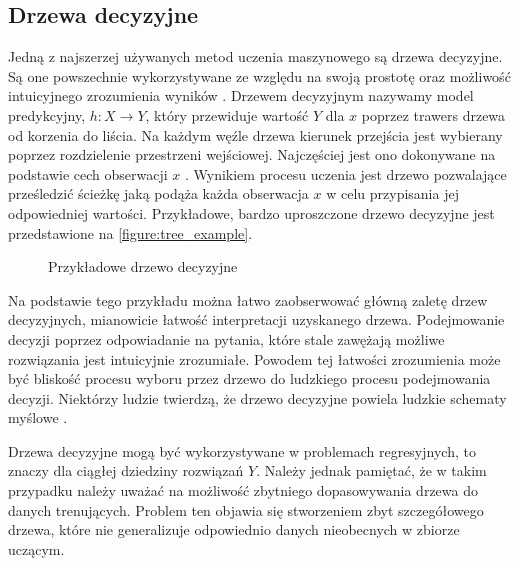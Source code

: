 \documentclass[10pt,a4paper]{article}
\begin{document}
\subsection{Drzewa decyzyjne}
Jedną z najszerzej używanych metod uczenia maszynowego są drzewa decyzyjne. Są one powszechnie wykorzystywane ze względu na swoją prostotę oraz możliwość intuicyjnego zrozumienia wyników \cite{wu2008top}. Drzewem decyzyjnym nazywamy model predykcyjny, $h: X \rightarrow Y$, który przewiduje wartość $Y$ dla $x$ poprzez trawers drzewa od korzenia do liścia. Na każdym węźle drzewa kierunek przejścia jest wybierany poprzez rozdzielenie przestrzeni wejściowej. Najczęściej jest ono dokonywane na podstawie cech obserwacji $x$ \cite{books/daglib/0033642}. Wynikiem procesu uczenia jest drzewo pozwalające prześledzić ścieżkę jaką podąża każda obserwacja $x$ w celu przypisania jej odpowiedniej wartości. Przykładowe, bardzo uproszczone drzewo decyzyjne jest przedstawione na \autoref{figure:tree_example}.
\begin{figure}[!ht]
	\centering
	\caption{Przykładowe drzewo decyzyjne}
	\label{figure:tree_example}
\end{figure}
\FloatBarrier

Na podstawie tego przykładu można łatwo zaobserwować główną zaletę drzew decyzyjnych, mianowicie łatwość interpretacji uzyskanego drzewa. Podejmowanie decyzji poprzez odpowiadanie na pytania, które stale zawężają możliwe rozwiązania jest intuicyjnie zrozumiałe. Powodem tej łatwości zrozumienia może być bliskość procesu wyboru przez drzewo do ludzkiego procesu podejmowania decyzji. Niektórzy ludzie twierdzą, że drzewo decyzyjne powiela ludzkie schematy myślowe \cite{James2013}. 

Drzewa decyzyjne mogą być wykorzystywane w problemach regresyjnych, to znaczy dla ciągłej dziedziny rozwiązań $Y$. Należy jednak pamiętać, że w takim przypadku  należy uważać na możliwość zbytniego dopasowywania drzewa do danych trenujących. Problem ten objawia się stworzeniem zbyt szczegółowego drzewa, które nie generalizuje odpowiednio danych nieobecnych w zbiorze uczącym.
\end{document}
